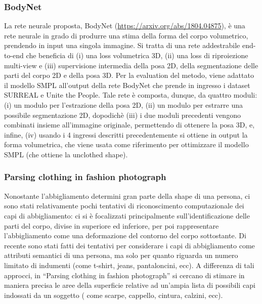 \subsubsection{BodyNet}
La rete neurale proposta, BodyNet (\url{https://arxiv.org/abs/1804.04875}), è una rete neurale in grado di produrre una stima della forma del corpo volumetrico, prendendo in input una singola immagine. Si tratta di una rete addestrabile end-to-end che beneficia di (i) una loss volumetrica 3D, (ii) una loss di riproiezione multi-view e (iii) supervisione intermedia della posa 2D, della segmentazione delle parti del corpo 2D e della posa 3D. Per la evaluation del metodo, viene adattato il modello SMPL all’output della rete BodyNet che prende in ingresso i dataset SURREAL e Unite the People. Tale rete è composta, dunque, da quattro moduli: (i) un modulo per l’estrazione della posa 2D, (ii) un modulo per estrarre una possibile segmentazione 2D, dopodichè (iii) i due moduli precedenti vengono combinati insieme all'immagine originale, permettendo di ottenere la posa 3D, e, infine, (iv) usando i 4 ingressi descritti precedentemente si ottiene in output la forma volumetrica, che viene usata come riferimento per ottimizzare il modello SMPL (che ottiene la unclothed shape).

\subsubsection{Parsing clothing in fashion photograph}
Nonostante l’abbigliamento determini gran parte della shape di una persona, ci sono stati relativamente pochi tentativi di riconoscimento computazionale dei capi di abbigliamento: ci si è focalizzati principalmente sull’identificazione delle parti del corpo, divise in superiore ed inferiore, per poi rappresentare l’abbigliamento come una deformazione del contorno del corpo sottostante. Di recente sono stati fatti dei tentativi per considerare i capi di abbigliamento come attributi semantici di una persona, ma solo per quanto riguarda un numero limitato di indumenti (come t-shirt, jeans, pantaloncini, ecc).
A differenza di tali approcci, in “Parsing clothing in fashion photograph” si cercano di stimare in maniera precisa le aree della superficie relative ad un’ampia lista di possibili capi indossati da un soggetto ( come scarpe, cappello, cintura, calzini, ecc).

